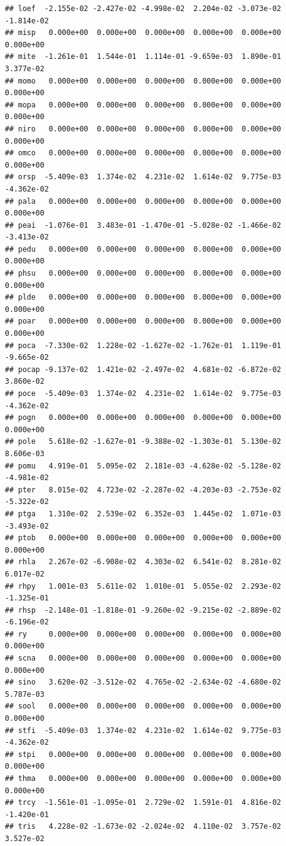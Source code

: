 \documentclass[
]{article}
\begin{document}
\begin{verbatim}
## loef  -2.155e-02 -2.427e-02 -4.998e-02  2.204e-02 -3.073e-02 -1.814e-02
## misp   0.000e+00  0.000e+00  0.000e+00  0.000e+00  0.000e+00  0.000e+00
## mite  -1.261e-01  1.544e-01  1.114e-01 -9.659e-03  1.890e-01  3.377e-02
## momo   0.000e+00  0.000e+00  0.000e+00  0.000e+00  0.000e+00  0.000e+00
## mopa   0.000e+00  0.000e+00  0.000e+00  0.000e+00  0.000e+00  0.000e+00
## niro   0.000e+00  0.000e+00  0.000e+00  0.000e+00  0.000e+00  0.000e+00
## omco   0.000e+00  0.000e+00  0.000e+00  0.000e+00  0.000e+00  0.000e+00
## orsp  -5.409e-03  1.374e-02  4.231e-02  1.614e-02  9.775e-03 -4.362e-02
## pala   0.000e+00  0.000e+00  0.000e+00  0.000e+00  0.000e+00  0.000e+00
## peai  -1.076e-01  3.483e-01 -1.470e-01 -5.028e-02 -1.466e-02 -3.413e-02
## pedu   0.000e+00  0.000e+00  0.000e+00  0.000e+00  0.000e+00  0.000e+00
## phsu   0.000e+00  0.000e+00  0.000e+00  0.000e+00  0.000e+00  0.000e+00
## plde   0.000e+00  0.000e+00  0.000e+00  0.000e+00  0.000e+00  0.000e+00
## poar   0.000e+00  0.000e+00  0.000e+00  0.000e+00  0.000e+00  0.000e+00
## poca  -7.330e-02  1.228e-02 -1.627e-02 -1.762e-01  1.119e-01 -9.665e-02
## pocap -9.137e-02  1.421e-02 -2.497e-02  4.681e-02 -6.872e-02  3.860e-02
## poce  -5.409e-03  1.374e-02  4.231e-02  1.614e-02  9.775e-03 -4.362e-02
## pogn   0.000e+00  0.000e+00  0.000e+00  0.000e+00  0.000e+00  0.000e+00
## pole   5.618e-02 -1.627e-01 -9.388e-02 -1.303e-01  5.130e-02  8.606e-03
## pomu   4.919e-01  5.095e-02  2.181e-03 -4.628e-02 -5.128e-02 -4.981e-02
## pter   8.015e-02  4.723e-02 -2.287e-02 -4.203e-03 -2.753e-02 -5.322e-02
## ptga   1.310e-02  2.539e-02  6.352e-03  1.445e-02  1.071e-03 -3.493e-02
## ptob   0.000e+00  0.000e+00  0.000e+00  0.000e+00  0.000e+00  0.000e+00
## rhla   2.267e-02 -6.908e-02  4.303e-02  6.541e-02  8.281e-02  6.017e-02
## rhpy   1.001e-03  5.611e-02  1.010e-01  5.055e-02  2.293e-02 -1.325e-01
## rhsp  -2.148e-01 -1.818e-01 -9.260e-02 -9.215e-02 -2.889e-02 -6.196e-02
## ry     0.000e+00  0.000e+00  0.000e+00  0.000e+00  0.000e+00  0.000e+00
## scna   0.000e+00  0.000e+00  0.000e+00  0.000e+00  0.000e+00  0.000e+00
## sino   3.620e-02 -3.512e-02  4.765e-02 -2.634e-02 -4.680e-02  5.787e-03
## sool   0.000e+00  0.000e+00  0.000e+00  0.000e+00  0.000e+00  0.000e+00
## stfi  -5.409e-03  1.374e-02  4.231e-02  1.614e-02  9.775e-03 -4.362e-02
## stpi   0.000e+00  0.000e+00  0.000e+00  0.000e+00  0.000e+00  0.000e+00
## thma   0.000e+00  0.000e+00  0.000e+00  0.000e+00  0.000e+00  0.000e+00
## trcy  -1.561e-01 -1.095e-01  2.729e-02  1.591e-01  4.816e-02 -1.420e-01
## tris   4.228e-02 -1.673e-02 -2.024e-02  4.110e-02  3.757e-02  3.527e-02

\end{verbatim}
\end{document}

